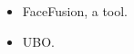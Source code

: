 \documentclass{article}
\begin{document}
\begin{itemize}
  \setlength
  \item FaceFusion, a tool.
  \item UBO.
\end{itemize}
\end{document}
